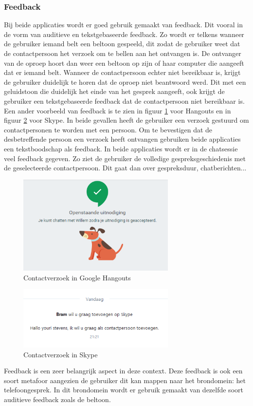 \documentclass[11pt]{article}
\begin{document}
\subsubsection{Feedback}
Bij beide applicaties wordt er goed gebruik gemaakt van feedback. Dit vooral in de vorm van auditieve en tekstgebaseerde feedback. Zo wordt er telkens wanneer de gebruiker iemand belt een beltoon gespeeld, dit zodat de gebruiker weet dat de contactpersoon het verzoek om te bellen aan het ontvangen is. De ontvanger van de oproep hoort dan weer een beltoon op zijn of haar computer die aangeeft dat er iemand belt. Wanneer de contactpersoon echter niet bereikbaar is, krijgt de gebruiker duidelijk te horen dat de oproep niet beantwoord werd. Dit met een geluidstoon die duidelijk het einde van het gesprek aangeeft, ook krijgt de gebruiker een tekstgebaseerde feedback dat de contactpersoon niet bereikbaar is.
\newline
Een ander voorbeeld van feedback is te zien in figuur \ref{fig:VerzoekHangouts} voor Hangouts en in figuur \ref{fig:VerzoekSkype} voor Skype. In beide gevallen heeft de gebruiker een verzoek gestuurd om contactpersonen te worden met een persoon. Om te bevestigen dat de desbetreffende persoon een verzoek heeft ontvangen gebruiken beide applicaties een tekstboodschap als feedback. In beide applicaties wordt er in de chatsessie veel feedback gegeven. Zo ziet de gebruiker de volledige gespreksgeschiedenis met de geselecteerde contactpersoon. Dit gaat dan over gespreksduur, chatberichten...
\begin{figure}
	\centering
	\includegraphics[width=0.7\textwidth]{Bram_ScreenshotGH2.png}
	\caption{Contactverzoek in Google Hangouts}
	\label{fig:VerzoekHangouts}
\end{figure}
\begin{figure}
	\centering
	\includegraphics[width=0.7\textwidth]{Bram_ScreenshotSkype2.png}
	\caption{Contactverzoek in Skype}
	\label{fig:VerzoekSkype}
\end{figure}
\newline
Feedback is een zeer belangrijk aspect in deze context. Deze feedback is ook een soort metafoor aangezien de gebruiker dit kan mappen naar het brondomein: het telefoongesprek. In dit brondomein wordt er gebruik gemaakt van dezelfde soort auditieve feedback zoals de beltoon.
\end{document}
